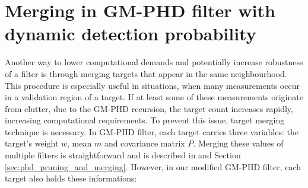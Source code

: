 \section{Merging in GM-PHD filter with dynamic detection probability}
Another way to lower computational demands and potentially increase robustness of a filter is through merging
targets that appear in the same neighbourhood. This procedure is especially useful in situations, when many measurements
occur in a validation region of a target. If at least some of these measurements originate from clutter, due to the
GM-PHD recursion, the target count increases rapidly, increasing computational requirements. To prevent this issue,
target merging technique is necessary.
In GM-PHD filter, each target carries three variables: the target's weight $w$, mean $m$ and covariance matrix $P$.
Merging these values of multiple filters is straightforward and is described in \cite{VoMaPHD2006} and Section \ref{sec:phd_pruning_and_merging}. However, in our modified GM-PHD filter, each target also holds these informations:
